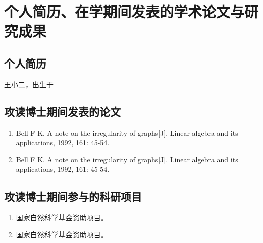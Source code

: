 

\chapter*{个人简历、在学期间发表的学术论文与研究成果}
\section*{个人简历}
王小二，出生于
\section*{攻读博士期间发表的论文}
\begin{enumerate}
\renewcommand{\labelenumi}{[\theenumi]}
\item Bell F K. A note on the irregularity of graphs[J]. Linear algebra and its applications, 1992, 161: 45-54.
\item Bell F K. A note on the irregularity of graphs[J]. Linear algebra and its applications, 1992, 161: 45-54.
\end{enumerate}
\section*{攻读博士期间参与的科研项目}
\begin{enumerate}
\renewcommand{\labelenumi}{[\theenumi]}
\item 国家自然科学基金资助项目。
\item 国家自然科学基金资助项目。
\end{enumerate}
